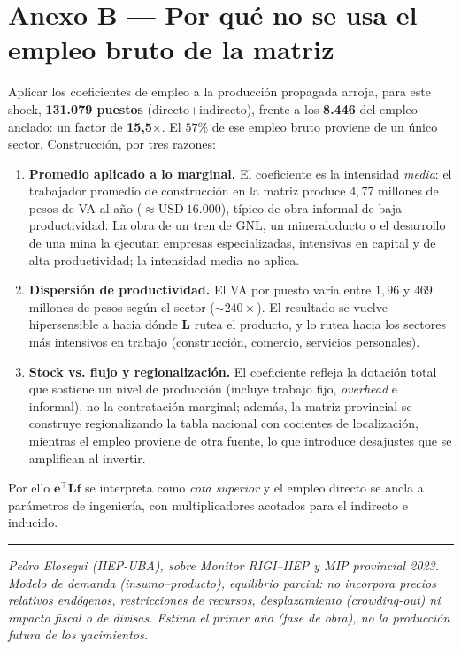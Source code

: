 \documentclass[11pt]{article}
\begin{document}
\section{Anexo B --- Por qué no se usa el empleo bruto de la matriz}
Aplicar los coeficientes de empleo a la producción propagada arroja, para este shock, \textbf{131.079 puestos} (directo+indirecto), frente a los \textbf{8.446} del empleo anclado: un factor de \textbf{15{,}5$\times$}. El $57\%$ de ese empleo bruto proviene de un único sector, Construcción, por tres razones:
\begin{enumerate}
\item \textbf{Promedio aplicado a lo marginal.} El coeficiente es la intensidad \emph{media}: el trabajador promedio de construcción en la matriz produce $4,77$ millones de pesos de VA al año ($\approx \mathrm{USD}~16.000$), típico de obra informal de baja productividad. La obra de un tren de GNL, un mineraloducto o el desarrollo de una mina la ejecutan empresas especializadas, intensivas en capital y de alta productividad; la intensidad media no aplica.
\item \textbf{Dispersión de productividad.} El VA por puesto varía entre $1,96$ y $469$ millones de pesos según el sector ($\sim\!240\times$). El resultado se vuelve hipersensible a hacia dónde $\mathbf{L}$ rutea el producto, y lo rutea hacia los sectores más intensivos en trabajo (construcción, comercio, servicios personales).
\item \textbf{Stock vs. flujo y regionalización.} El coeficiente refleja la dotación total que sostiene un nivel de producción (incluye trabajo fijo, \emph{overhead} e informal), no la contratación marginal; además, la matriz provincial se construye regionalizando la tabla nacional con cocientes de localización, mientras el empleo proviene de otra fuente, lo que introduce desajustes que se amplifican al invertir.
\end{enumerate}
\noindent Por ello $\mathbf{e}^{\top}\mathbf{L}\mathbf{f}$ se interpreta como \emph{cota superior} y el empleo directo se ancla a parámetros de ingeniería, con multiplicadores acotados para el indirecto e inducido.

\vspace{4pt}
\hrule
\vspace{3pt}
{\footnotesize\itshape Pedro Elosegui (IIEP-UBA), sobre Monitor RIGI--IIEP y MIP provincial 2023. Modelo de demanda (insumo--producto), equilibrio parcial: no incorpora precios relativos endógenos, restricciones de recursos, desplazamiento (\emph{crowding-out}) ni impacto fiscal o de divisas. Estima el primer año (fase de obra), no la producción futura de los yacimientos.}
\end{document}
